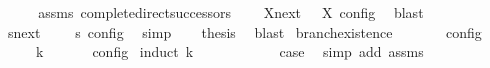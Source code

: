 \begin{isabellebody}
%
\isadelimproof
%
\endisadelimproof
%
\isatagproof
{}\isamarkupfalse%
\ {\isacharminus}\isanewline
\ \ \isamarkupfalse%
\ assms\ complete{\isacharunderscore}direct{\isacharunderscore}successors{\isacharprime}\ \isamarkupfalse%
\ {\isacartoucheopen}{\isasymrho}\ {\isasymin}\ {\isacharparenleft}{\isasymUnion}X{\isasymin}{\isasymC}\isactrlsub n\isactrlsub e\isactrlsub x\isactrlsub t\ {\isasymS}\ {\isasymlbrakk}\ X\ {\isasymrbrakk}\isactrlsub c\isactrlsub o\isactrlsub n\isactrlsub f\isactrlsub i\isactrlsub g{\isacharparenright}{\isacartoucheclose}\ \isamarkupfalse%
\ blast\isanewline
\ \ \isamarkupfalse%
\ {\isacartoucheopen}{\isasymexists}s{\isasymin}{\isasymC}\isactrlsub n\isactrlsub e\isactrlsub x\isactrlsub t\ {\isasymS}\ {\isasymrho}\ {\isasymin}\ {\isasymlbrakk}\ s\ {\isasymrbrakk}\isactrlsub c\isactrlsub o\isactrlsub n\isactrlsub f\isactrlsub i\isactrlsub g{\isacartoucheclose}\ \isamarkupfalse%
\ simp\isanewline
\ \ \isamarkupfalse%
\ {\isacharquery}thesis\ \isamarkupfalse%
\ blast\isanewline
{}\isamarkupfalse%
%
\endisatagproof
{\isafoldproof}%
%
\isadelimproof
\isanewline
%
\endisadelimproof
\isanewline
{}\isamarkupfalse%
\ branch{\isacharunderscore}existence{\isacharprime}{\isacharcolon}\isanewline
\ \ \ {\isacartoucheopen}{\isasymrho}\ {\isasymin}\ {\isasymlbrakk}\ {\isasymS}\ {\isasymrbrakk}\isactrlsub c\isactrlsub o\isactrlsub n\isactrlsub f\isactrlsub i\isactrlsub g{\isacartoucheclose}\isanewline
\ \ \ {\isacartoucheopen}{\isasymexists}{\isasymS}\ {\isacharparenleft}{\isasymS}\ {\isasymhookrightarrow}\isactrlbsup k\isactrlesup \ {\isasymS}\ {\isasymand}\ {\isacharparenleft}{\isasymrho}\ {\isasymin}\ {\isasymlbrakk}\ {\isasymS}\ {\isasymrbrakk}\isactrlsub c\isactrlsub o\isactrlsub n\isactrlsub f\isactrlsub i\isactrlsub g{\isacharparenright}{\isacartoucheclose}\isanewline
%
\isadelimproof
%
\endisadelimproof
%
\isatagproof
{}\isamarkupfalse%
\ {\isacharparenleft}induct\ k{\isacharparenright}\isanewline
\ \ \isamarkupfalse%
\ {}\isanewline
\ \ \ \ \isamarkupfalse%
\ \isamarkupfalse%
\ {\isacharquery}case\ \isamarkupfalse%
\ {\isacharparenleft}simp\ add{\isacharcolon}\ assms{\isacharparenright}\isanewline

\end{isabellebody}
